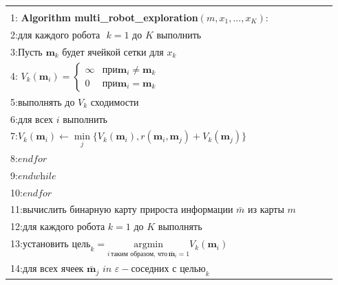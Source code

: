 \documentclass[10pt,a4paper]{article}
\begin{document}
\begin{table}[H]
\begin{center}
\begin{tabular}{|l|}
\hline
{}\\
1:\textbf{ Algorithm multi\_robot\_exploration}$(m,x_1,...,x_K):\qquad\qquad\qquad$\\
2:\hspace{5mm}$\textit{для каждого робота }\,\,k=1\,\,\textit{до}\,\,K\,\,\textit{выполнить}$\\
3:\hspace{10mm}$\textit{Пусть}\,\,\textbf{m}_k\,\,\textit{будет ячейкой сетки для}\,\,x_k$\\
4:\hspace{10mm}
$V_k(\textbf{m}_i)=\left\{\begin{array}{ll}
\infty&\mbox{при}\textbf{m}_i\neq\textbf{m}_k\\
0&\mbox{при}\textbf{m}_i=\textbf{m}_k
\end{array}
\right.$
\\
5:\hspace{10mm}$\textit{выполнять до}\,\,V_k\,\,\textit{сходимости}$\\
6:\hspace{15mm}$\textit{для всех i выполнить}$\\
7:\hspace{20mm}$V_k(\textbf{m}_i)\longleftarrow\underset{j}{\min}\{V_k(\textbf{m}_i),r(\textbf{m}_i,\textbf{m}_j)+V_k(\textbf{m}_j)\}$\\
8:\hspace{15mm}$\textit{endfor}$\\
9:\hspace{10mm}$\textit{endwhile}$\\
10:\hspace{4mm}$\textit{endfor}$\\
11:\hspace{4mm}$\textit{вычислить бинарную карту прироста информации}\,\,\bar{m}\,\,\textit{из карты}\,\,m$\\
12:\hspace{4mm}$\textit{для каждого робота}\,\,k=1\,\,\textit{до}\,\,K\,\,\textit{выполнять}$\\
13:\hspace{9mm}$\textit{установить}\,\,\text{цель}_k=\underset{i\,\text{таким образом, что}\,\bar{\textbf{m}}_i=1}{\text{argmin}}V_k(\textbf{m}_i)$\\
14:\hspace{9mm}$\textit{для всех ячеек}\,\,\bar{\textbf{m}}_j\,\,\textit{in}\,\,\varepsilon-\textit{соседних с}\,\,\text{целью}_k$\\

\end{tabular}
\end{center}
\end{table}
\end{document}

